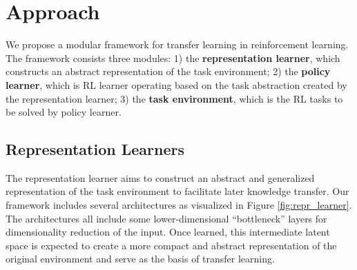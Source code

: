 \section{Approach}
\label{sec:approach}
We propose a modular framework for transfer learning in reinforcement learning. 
The framework consists three modules: 
1) the \textbf{representation learner}, which constructs an abstract representation of the task environment;
2) the \textbf{policy learner}, which is RL learner operating based on the task abstraction created by the representation learner;
3) the \textbf{task environment}, which is the RL tasks to be solved by policy learner.

\subsection{Representation Learners}
The representation learner aims to construct an abstract and generalized representation of the task environment to facilitate later knowledge transfer.
Our framework includes several architectures as visualized in Figure \ref{fig:repr_learner}.
The architectures all include some lower-dimensional ``bottleneck'' layers for dimensionality reduction of the input.
Once learned, this intermediate latent space is expected to create a more compact and abstract representation of the original environment and serve as the basis of transfer learning. 


